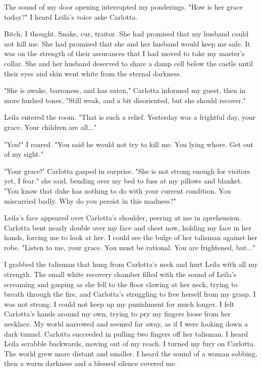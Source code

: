 \documentclass{article}
\begin{document}
The sound of my door opening interrupted my ponderings. "How is her grace today?" I heard Leila's voice aske Carlotta. 

Bitch, I thought. Snake, cur, traitor. She had promised that my husband could not kill me. She had promised that she and her husband would keep me safe. It was on the strength of their assurances that I had moved to take my master's collar. She and her husband deserved to share a damp cell below the castle until their eyes and skin went white from the eternal darkness.

"She is awake, barroness, and has eaten," Carlotta informed my guest, then in more hushed tones, "Still weak, and a bit disoriented, but she should recover."

Leila entered the room. "That is such a relief. Yesterday was a frightful day, your grace. Your children are all..."

"You!" I roared. "You said he would not try to kill me. You lying whore. Get out of my sight."

"Your grace!" Carlotta gasped in surprise. "She is not strong enough for visitors yet, I fear." she said, bending over my bed to fuss at my pillows and blanket. "You know that duke has nothing to do with your current condition. You miscarried badly. Why do you persist in this madness?"

Leila's face appeared over Carlotta's shoulder, peering at me in aprehension. Carlotta bent nearly double over my face and chest now, holding my face in her hands, forcing me to look at her. I could see the bulge of her talisman against her robe. "Listen to me, your grace. You must be rational. You are frightened, but..."

I grabbed the talisman that hung from Carlotta's neck and hurt Leila with all my strength. The small white recovery chamber filled with the sound of Leila's screaming and gasping as she fell to the floor clawing at her neck, trying to breath through the fire, and Carlotta's struggling to free herself from my grasp. I was not strong. I could not keep up my punishment for much longer. I felt Carlotta's hands around my own, trying to pry my fingers loose from her necklace. My world narrowed and seemed far away, as if I were looking down a dark tunnel. Carlotta succeeded in pulling two fingers off her talisman. I heard Leila scrabble backwards, moving out of my reach. I turned my fury on Carlotta. The world grew more distant and smaller. I heard the sound of a woman sobbing, then a warm darkness and a blessed silence covered me.
\end{document}
